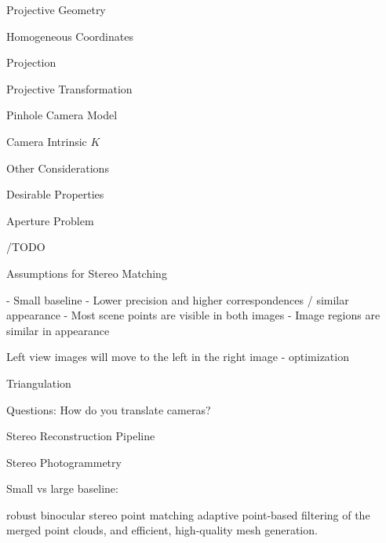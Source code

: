 \begin{section}
\begin{subsubsection}
\begin{subsubsection}
\begin{subsubsection}
\begin{section}{Projective Geometry}
\begin{subsection}{Homogeneous Coordinates}
\begin{subsubsection}
{\begin{subsubsection}{Projection}
\begin{subsubsection}{Projective Transformation}
\begin{subsection}
\begin{subsubsection}
\begin{subsubsection}
\begin{subsubsection}
{\begin{subsubsection}
\begin{subsection}
\begin{subsection} {Pinhole Camera Model}
\begin{subsection} {Camera Intrinsic $K$}
\begin{subsection}
\begin{subsection}
\begin{subsubsection}{Other Considerations}
{\begin{subsection}
\begin{subsubsection}{Desirable Properties}
\begin{section}
\begin{subsection}
\begin{subsection}
\begin{subsection}
\begin{section}
\begin{subsection}
\begin{subsubsection}
\begin{subsubsection}
\begin{subsection}
\begin{section}
\begin{subsection}
\begin{subsubsection}{Aperture Problem}
\begin{subsubsection}
{\begin{section}
\begin{subsubsection}
\begin{subsubsection}
\begin{subsubsection}
\begin{subsection}
\begin{subsection}
\begin{subsection}
\begin{subsection}
\begin{subsection}
\begin{subsection}
\begin{subsection}
{\begin{section}
\begin{subsection}
\begin{subsection}
\begin{subsection}
\begin{subsubsection}
/TODO

\begin{subsection} Assumptions for Stereo Matching

- Small baseline
  - Lower precision and higher correspondences  / similar appearance
- Most scene points are visible in both images
- Image regions are similar in appearance

Left view images will move to the left in the right image - optimization

\begin{subsection} Triangulation

Questions: How do you translate cameras?


\begin{section} Stereo Reconstruction Pipeline

\begin{subsection} Stereo Photogrammetry

Small vs large baseline:

robust binocular stereo
point matching
adaptive point-based filtering of the
merged point clouds, and efficient, high-quality mesh generation.


\end{subsection}
\end{section}
\end{subsection}
\end{subsection}
\end{subsubsection}
\end{subsection}
\end{subsection}
\end{subsection}
\end{section}}
\end{subsection}
\end{subsection}
\end{subsection}
\end{subsection}
\end{subsection}
\end{subsection}
\end{subsection}
\end{subsubsection}
\end{subsubsection}
\end{subsubsection}
\end{section}}
\end{subsubsection}
\end{subsubsection}
\end{subsection}
\end{section}
\end{subsection}
\end{subsubsection}
\end{subsubsection}
\end{subsection}
\end{section}
\end{subsection}
\end{subsection}
\end{subsection}
\end{section}
\end{subsubsection}
\end{subsection}}
\end{subsubsection}
\end{subsection}
\end{subsection}
\end{subsection}
\end{subsection}
\end{subsection}
\end{subsubsection}}
\end{subsubsection}
\end{subsubsection}
\end{subsubsection}
\end{subsection}
\end{subsubsection}
\end{subsubsection}}
\end{subsubsection}
\end{subsection}
\end{section}
\end{subsubsection}
\end{subsubsection}
\end{subsubsection}
\end{section}
